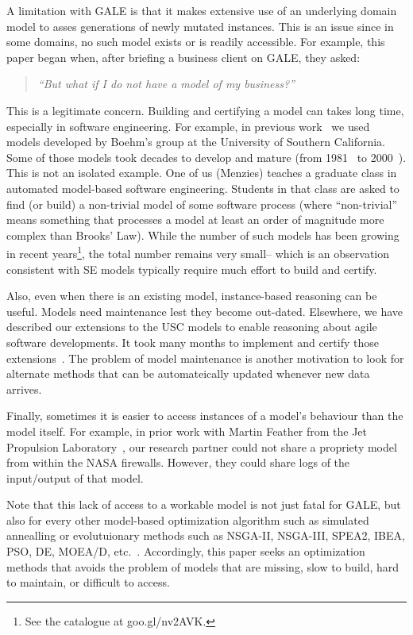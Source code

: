 \documentclass[conference]{IEEEtran}
\begin{document}
A limitation with GALE is that it makes extensive use of
an underlying domain model to asses generations of newly mutated instances.  This is an issue since
in some domains, no such model exists or is readily accessible. For example, this   paper
began when, after briefing a business client on GALE, they asked:
\begin{quote}
{\em ``But what if I do not have a model of my business?''}
\end{quote}
This is a legitimate concern.
Building and certifying a model  can  takes  long time, especially in software engineering. For  example, in previous work~\cite{me07f} we used models
developed by Boehm's group at the University of Southern California.
Some of those models took decades to develop and mature (from 1981~\cite{boehm81} to 2000~\cite{boehm00b}).  This is not an isolated example. One of us (Menzies) teaches a graduate class in automated model-based software engineering. 
Students in that class are asked to find (or build) a non-trivial model of
some software process (where ``non-trivial'' means something that processes
a  model at least an order of magnitude more complex than Brooks' Law). 
While the  number of such models has been growing in recent years\footnote{See the
catalogue at goo.gl/nv2AVK.}, 
the total number remains very small-- which is an observation consistent with
SE models typically require  much effort to build and certify.

Also, even when there is an existing model, instance-based reasoning can be useful.
Models need maintenance lest they become out-dated. Elsewhere, we have described our
extensions to the USC models to enable reasoning about agile software developments. 
It took many months to implement and certify those extensions~\cite{me09i,me09j}.
The problem of model maintenance is another
motivation to look for alternate methods that can be automateically updated whenever new data arrives.

Finally, sometimes  it is easier to access instances of a model's behaviour than the model
itself. For example, in prior work with Martin  Feather from the Jet Propulsion 
Laboratory~\cite{fea02a},  our research partner could not share a
propriety model from within the NASA firewalls. However, they could share 
logs of the input/output of that model.
 
Note that this lack of access to a workable model is not just fatal for GALE, but also for every
other model-based optimization algorithm such as simulated
annealling or evolutuionary methods such as   
NSGA-II, NSGA-III, SPEA2, IBEA, PSO, DE, MOEA/D, etc.~\cite{deb00a,zit02,zit04,%
deb14,Cui2005a,storn97,zhang07:TEC}. Accordingly, this paper seeks
an optimization methods that avoids the problem of models that are missing, slow
to build, hard to maintain, or difficult to access.
\end{document}
